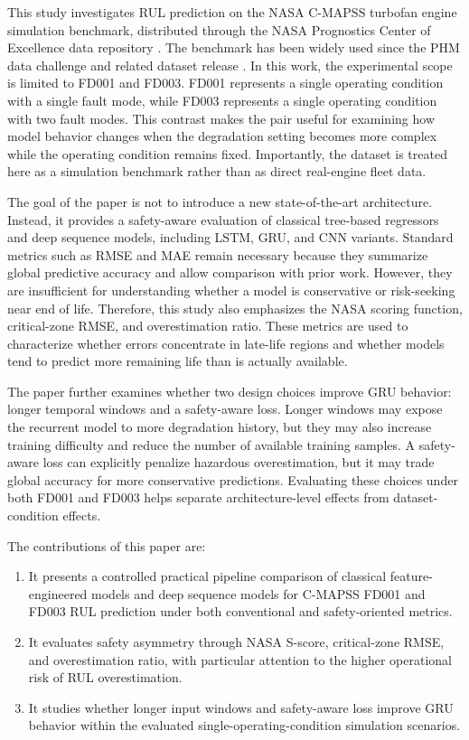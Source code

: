 \documentclass[11pt,a4paper]{article}
\begin{document}
This study investigates RUL prediction on the NASA C-MAPSS turbofan engine simulation benchmark, distributed through the NASA Prognostics Center of Excellence data repository \citep{NASA_PCoE}. The benchmark has been widely used since the PHM data challenge and related dataset release \citep{Saxena2008}. In this work, the experimental scope is limited to FD001 and FD003. FD001 represents a single operating condition with a single fault mode, while FD003 represents a single operating condition with two fault modes. This contrast makes the pair useful for examining how model behavior changes when the degradation setting becomes more complex while the operating condition remains fixed. Importantly, the dataset is treated here as a simulation benchmark rather than as direct real-engine fleet data.

The goal of the paper is not to introduce a new state-of-the-art architecture. Instead, it provides a safety-aware evaluation of classical tree-based regressors and deep sequence models, including LSTM, GRU, and CNN variants. Standard metrics such as RMSE and MAE remain necessary because they summarize global predictive accuracy and allow comparison with prior work. However, they are insufficient for understanding whether a model is conservative or risk-seeking near end of life. Therefore, this study also emphasizes the NASA scoring function, critical-zone RMSE, and overestimation ratio. These metrics are used to characterize whether errors concentrate in late-life regions and whether models tend to predict more remaining life than is actually available.

The paper further examines whether two design choices improve GRU behavior: longer temporal windows and a safety-aware loss. Longer windows may expose the recurrent model to more degradation history, but they may also increase training difficulty and reduce the number of available training samples. A safety-aware loss can explicitly penalize hazardous overestimation, but it may trade global accuracy for more conservative predictions. Evaluating these choices under both FD001 and FD003 helps separate architecture-level effects from dataset-condition effects.

The contributions of this paper are:
\begin{enumerate}
    \item It presents a controlled practical pipeline comparison of classical feature-engineered models and deep sequence models for C-MAPSS FD001 and FD003 RUL prediction under both conventional and safety-oriented metrics.
    \item It evaluates safety asymmetry through NASA S-score, critical-zone RMSE, and overestimation ratio, with particular attention to the higher operational risk of RUL overestimation.
    \item It studies whether longer input windows and safety-aware loss improve GRU behavior within the evaluated single-operating-condition simulation scenarios.
\end{enumerate}
\end{document}
